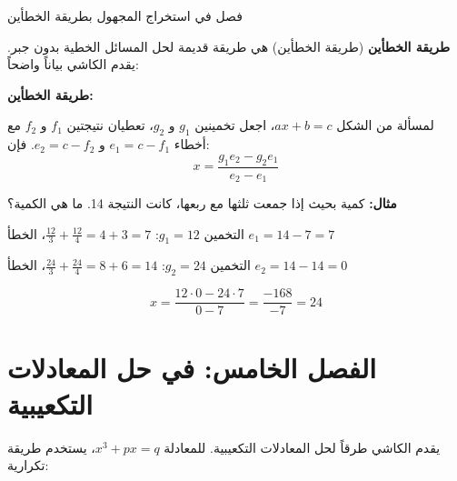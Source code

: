 \documentclass[11pt,a4paper]{book}
\newcommand{\ar}[1]{\arabicfont\beginR #1\endR}
\newcommand{\arLarge}[1]{{\Large\arabicfont\beginR #1\endR}}
\newenvironment{arabicbox}{%
  \begin{framed}
  \begin{minipage}{\linewidth-2\fboxsep-2\fboxrule}
  \setlength{\parindent}{0pt}
  \linespread{1.3}\selectfont
}{%
  \end{minipage}
  \end{framed}
}
\newenvironment{mathalgo}{%
  \par\vspace{0.3cm}
  \begin{framed}
  \setlength{\parindent}{0pt}
}{%
  \end{framed}
  \par\vspace{0.3cm}
}
\begin{document}
\begin{arabicbox}
\begin{center}
\arLarge{فصل في استخراج المجهول بطريقة الخطأين}
\end{center}
\end{arabicbox}

\vspace{0.3cm}

\noindent\ar{\textbf{طريقة الخطأين} (\ar{طريقة الخطأين}) هي طريقة قديمة لحل المسائل الخطية بدون جبر. يقدم الكاشي بياناً واضحاً:}

\begin{mathalgo}
\textbf{\ar{طريقة الخطأين:}}

\ar{لمسألة من الشكل} $ax + b = c$، \ar{اجعل تخمينين $g_1$ و $g_2$، تعطيان نتيجتين $f_1$ و $f_2$ مع أخطاء} $e_1 = c - f_1$ \ar{و} $e_2 = c - f_2$. \ar{فإن:}
\[
x = \frac{g_1 e_2 - g_2 e_1}{e_2 - e_1}
\]

\vspace{0.3cm}
\noindent\textbf{\ar{مثال:}} \ar{كمية بحيث إذا جمعت ثلثها مع ربعها، كانت النتيجة 14. ما هي الكمية؟}

\vspace{0.3cm}
\ar{التخمين} $g_1 = 12$: $\frac{12}{3} + \frac{12}{4} = 4 + 3 = 7$، \ar{الخطأ} $e_1 = 14 - 7 = 7$

\vspace{0.2cm}
\ar{التخمين} $g_2 = 24$: $\frac{24}{3} + \frac{24}{4} = 8 + 6 = 14$، \ar{الخطأ} $e_2 = 14 - 14 = 0$

\[
x = \frac{12 \cdot 0 - 24 \cdot 7}{0 - 7} = \frac{-168}{-7} = 24
\]
\end{mathalgo}

\section{\ar{الفصل الخامس: في حل المعادلات التكعيبية}}

\noindent\ar{يقدم الكاشي طرقاً لحل المعادلات التكعيبية. للمعادلة $x^3 + px = q$، يستخدم طريقة تكرارية:}
\end{document}
